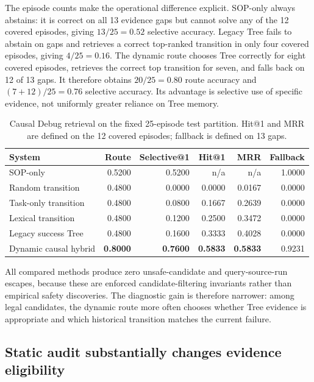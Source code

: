 \documentclass{article}
\begin{document}
The episode counts make the operational difference explicit.  SOP-only always
abstains: it is correct on all 13 evidence gaps but cannot solve any of the 12
covered episodes, giving $13/25=0.52$ selective accuracy.  Legacy Tree fails to
abstain on gaps and retrieves a correct top-ranked transition in only four
covered episodes, giving $4/25=0.16$.  The dynamic route chooses Tree correctly
for eight covered episodes, retrieves the correct top transition for seven, and
falls back on 12 of 13 gaps.  It therefore obtains $20/25=0.80$ route accuracy
and $(7+12)/25=0.76$ selective accuracy.  Its advantage is selective use of
specific evidence, not uniformly greater reliance on Tree memory.

\begin{table}[t]
\caption{Causal Debug retrieval on the fixed 25-episode test partition.  Hit@1
and MRR are defined on the 12 covered episodes; fallback is defined on 13 gaps.}
\label{tab:causal}
\centering
\footnotesize
\begin{tabular}{lrrrrr}
\toprule
System & Route & Selective@1 & Hit@1 & MRR & Fallback \\
\midrule
SOP-only & 0.5200 & 0.5200 & n/a & n/a & 1.0000 \\
Random transition & 0.4800 & 0.0000 & 0.0000 & 0.0167 & 0.0000 \\
Task-only transition & 0.4800 & 0.0800 & 0.1667 & 0.2639 & 0.0000 \\
Lexical transition & 0.4800 & 0.1200 & 0.2500 & 0.3472 & 0.0000 \\
Legacy success Tree & 0.4800 & 0.1600 & 0.3333 & 0.4028 & 0.0000 \\
Dynamic causal hybrid & \textbf{0.8000} & \textbf{0.7600} & \textbf{0.5833} & \textbf{0.5833} & 0.9231 \\
\bottomrule
\end{tabular}
\end{table}

All compared methods produce zero unsafe-candidate and query-source-run escapes,
because these are enforced candidate-filtering invariants rather than empirical
safety discoveries.  The diagnostic gain is therefore narrower: among legal
candidates, the dynamic route more often chooses whether Tree evidence is
appropriate and which historical transition matches the current failure.

\subsection{Static audit substantially changes evidence eligibility}
\end{document}

